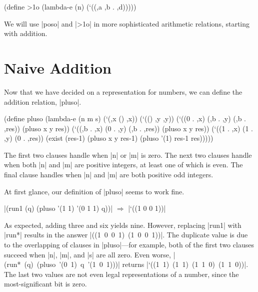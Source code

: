 \newpage

\begin{schemedisplay}
(define >1o
  (lambda-e (n)
    (`((,a ,b . ,d)))))
\end{schemedisplay}

\noindent We will use \scheme|poso| and \scheme|>1o| in more
sophisticated arithmetic relations, starting with addition.

\section{Naive Addition}\label{arithnaive}

Now that we have decided on a representation for numbers, we can
define the addition relation, \scheme|pluso|.  

\schemedisplayspace
\begin{schemedisplay}
(define pluso
  (lambda-e (n m s)
    (`(,x () ,x))
    (`(() ,y ,y))
    (`((0 . ,x) (,b . ,y) (,b . ,res))
     (pluso x y res))    
    (`((,b . ,x) (0 . ,y) (,b . ,res))
     (pluso x y res))
    (`((1 . ,x) (1 . ,y) (0 . ,res))
     (exist (res-1)
       (pluso x y res-1)
       (pluso '(1) res-1 res)))))
\end{schemedisplay}

\noindent The first two clauses handle when \scheme|n| or \scheme|m|
is zero.  The next two clauses handle when both \scheme|n| and
\scheme|m| are positive integers, at least one of which is even.  The
final clause handles when \scheme|n| and \scheme|m| are both positive
odd integers.

At first glance, our definition of \scheme|pluso| seems to work fine.

\wspace

\noindent\scheme|(run1 (q) (pluso '(1 1) '(0 1 1) q))| $\Rightarrow$ \scheme|`((1 0 0 1))|

\wspace

\noindent As expected, adding three and six yields nine.  However,
replacing \scheme|run1| with \scheme|run*| results in the answer
\mbox{\scheme|((1 0 0 1) (1 0 0 1))|}.  The duplicate value is due to
the overlapping of clauses in \scheme|pluso|---for example, both of
the first two clauses succeed when \scheme|n|, \scheme|m|, and
\scheme|s| are all zero.  Even worse, \mbox{\scheme|(run* (q) (pluso '(0 1) q '(1 0 1)))|}
 returns \mbox{\scheme|`((1 1) (1 1) (1 1 0) (1 1 0))|}. The
last two values are not even legal representations of a number, since
the most-significant bit is zero.

